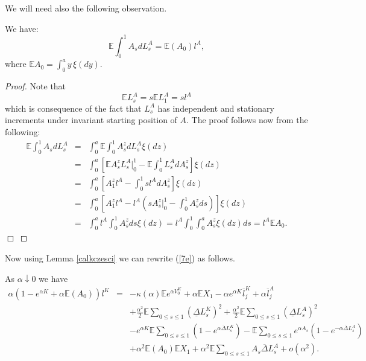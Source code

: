 \documentclass{aptpub}
\begin{document}
We will need also the following observation.

\begin{lem}\label{calkczesci}
We have:
$$\mathbb{E}\int_0^1A_sdL_s^A=\mathbb{E}(A_0)l^A,$$
where $\mathbb{E}A_0=\int_0^ay\,\xi(dy)$.
\end{lem}
\begin{proof}
Note that $$\mathbb{E}L_s^A=s\mathbb{E}L_1^A=sl^A$$ which is consequence of the fact that $L_s^A$ has independent and stationary increments
under invariant starting position of $A$.
The proof follows now from the following:
\begin{eqnarray*}
\mathbb{E}\int_0^1A_sdL_s^A&=&\int_0^a\mathbb{E}\int_0^1A_s^zdL_s^A\xi(dz)\\
&=&\int_0^a\left[\mathbb{E}A_s^zL_s^A|_0^1-\mathbb{E}\int_0^1L_s^AdA_s^z\right]\xi(dz)\\
&=&\int_0^a\left[A_1^zl^A-\int_0^1sl^AdA_s^z\right]\xi(dz)\\
&=&\int_0^a\left[A_1^zl^A-l^A(sA_s^z|_0^1-\int_0^1A_s^zds)\right]\xi(dz)\\
&=&\int_0^al^A\int_0^1A_s^zds\xi(dz)=l^A\int_0^1\int_0^aA_s^z\xi(dz)ds=l^A\mathbb{E}A_0.
\end{eqnarray*}{\newline\vspace{3mm}\hfill $\Box$}\end{proof}

Now using Lemma \ref{calkczesci} we can rewrite (\ref{7e}) as follows.
\begin{lem}\label{12lem} As $\alpha \downarrow 0$ we have
\begin{eqnarray}
\alpha (1-e^{\alpha K}+\alpha\mathbb{E}(A_0))l^K &=& -\kappa(\alpha)\mathbb{E} e^{\alpha V_0^K}+\alpha\mathbb{E}X_1-\alpha e^{\alpha K}\overline{l}_j^K+\alpha\overline{l}_j^A\nonumber\\
\nonumber &&+\frac{\alpha^2}{2}\mathbb{E}\sum_{0\leq s\leq 1}(\underline{\Delta}L_s^K)^2 +\frac{\alpha^2}{2}\mathbb{E}\sum_{0\leq s\leq 1}(\underline{\Delta}L_s^A)^2\\
\nonumber &&-e^{\alpha K}\mathbb{E}\sum_{0\leq s\leq 1}(1-e^{\alpha\overline{\Delta}L_s^K})-\mathbb{E}\sum_{0\leq s\leq 1}e^{\alpha A_s}(1-e^{-\alpha\overline{\Delta}L_s^A})\\ &&+\alpha^2\mathbb{E}(A_0)\mathbb{E}X_1+\alpha^2\mathbb{E}\sum_{0\leq s\leq 1}A_s\overline{\Delta} L_s^A+o(\alpha^2).\label{12e}
\end{eqnarray}
\end{lem}
\end{document}
